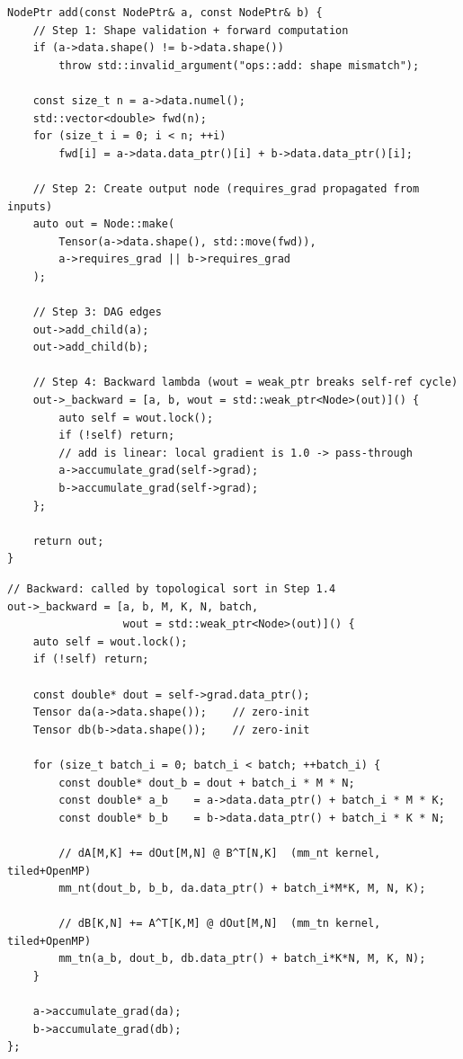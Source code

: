 \documentclass[12pt, a4paper]{article}
\begin{document}
\begin{lstlisting}[caption={\texttt{add} - simplest op, shows the full 4-step contract}]
NodePtr add(const NodePtr& a, const NodePtr& b) {
    // Step 1: Shape validation + forward computation
    if (a->data.shape() != b->data.shape())
        throw std::invalid_argument("ops::add: shape mismatch");

    const size_t n = a->data.numel();
    std::vector<double> fwd(n);
    for (size_t i = 0; i < n; ++i)
        fwd[i] = a->data.data_ptr()[i] + b->data.data_ptr()[i];

    // Step 2: Create output node (requires_grad propagated from inputs)
    auto out = Node::make(
        Tensor(a->data.shape(), std::move(fwd)),
        a->requires_grad || b->requires_grad
    );

    // Step 3: DAG edges
    out->add_child(a);
    out->add_child(b);

    // Step 4: Backward lambda (wout = weak_ptr breaks self-ref cycle)
    out->_backward = [a, b, wout = std::weak_ptr<Node>(out)]() {
        auto self = wout.lock();
        if (!self) return;
        // add is linear: local gradient is 1.0 -> pass-through
        a->accumulate_grad(self->grad);
        b->accumulate_grad(self->grad);
    };

    return out;
}
\end{lstlisting}

\begin{lstlisting}[caption={\texttt{matmul} backward - tiled kernels for dA and dB}]
// Backward: called by topological sort in Step 1.4
out->_backward = [a, b, M, K, N, batch,
                  wout = std::weak_ptr<Node>(out)]() {
    auto self = wout.lock();
    if (!self) return;

    const double* dout = self->grad.data_ptr();
    Tensor da(a->data.shape());    // zero-init
    Tensor db(b->data.shape());    // zero-init

    for (size_t batch_i = 0; batch_i < batch; ++batch_i) {
        const double* dout_b = dout + batch_i * M * N;
        const double* a_b    = a->data.data_ptr() + batch_i * M * K;
        const double* b_b    = b->data.data_ptr() + batch_i * K * N;

        // dA[M,K] += dOut[M,N] @ B^T[N,K]  (mm_nt kernel, tiled+OpenMP)
        mm_nt(dout_b, b_b, da.data_ptr() + batch_i*M*K, M, N, K);

        // dB[K,N] += A^T[K,M] @ dOut[M,N]  (mm_tn kernel, tiled+OpenMP)
        mm_tn(a_b, dout_b, db.data_ptr() + batch_i*K*N, M, K, N);
    }

    a->accumulate_grad(da);
    b->accumulate_grad(db);
};
\end{lstlisting}
\end{document}
